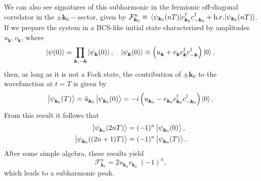 \documentclass[preprint,5p,times,twocolumn]{elsarticle}
\newcommand{\bmk}{\bm{k}}
\begin{document}
We can also see signatures of this subharmonic in the fermionic off-diagonal correlator in the $\pm \bmk_0-$sector, given by $\mathcal{F}_{\bmk_{0}}^{n}\equiv\expval{c_{\bmk_{0}}^{\dagger} c_{-\bmk_{0}}^{\dagger}+ \mbox{h.c.}}{\psi_{\bmk_{0}}(n T)}$. If we prepare the system in a BCS-like initial state characterized by amplitudes $u^{\;}_{\bmk}, v^{\;}_{\bmk}$, where
\begin{equation}
    \ket{\psi(0)}= \prod_{\bmk, -\bmk}\ket{\psi^{\;}_{\bmk}(0)}, \quad
    \ket{\psi^{\;}_{\bmk}(0)} \equiv \left(u^{\;}_{\bmk} + v^{\;}_{\bmk}c^\dagger_{\bmk}c^\dagger_{-\bmk}\right)\ket{0},	
\end{equation}
then, as long as it is not a Fock state, the contribution of $\pm\bmk_0$ to the wavefunction at $t=T$ 
is given by
\begin{equation}
    \ket{\psi^{\;}_{\bmk_0}(T)} = \hat{u}^{\;}_{\bmk_{0}}\ket{\psi^{\;}_{\bmk_0}(0)} = -i \left(u^{\;}_{\bmk_0} - v^{\;}_{\bmk_0}c^\dagger_{\bmk_0}c^\dagger_{-\bmk_0}\right)\ket{0}.
\end{equation}
From this result it follows that 
\begin{align}
\ket{\psi^{\;}_{\bmk_{0}}(2nT)}&=(-1)^n\ket{\psi^{\;}_{\bmk_{0}}(0)},\nonumber\\
\ket{\psi^{\;}_{\bmk_{0}}((2n+1)T)} &=(-1)^n\ket{\psi^{\;}_{\bmk_{0}}(T)}.
\end{align}
After some simple algebra, these results yield
\begin{equation}
    \mathcal{F}_{\bmk_{0}}^{n}=2 u^{\;}_{\bmk_{0}} v^{\;}_{\bmk_{0}}\;(-1)^{n},
    \label{eq:corrpeaks}
\end{equation}
which leads to a subharmonic peak. 
\end{document}
